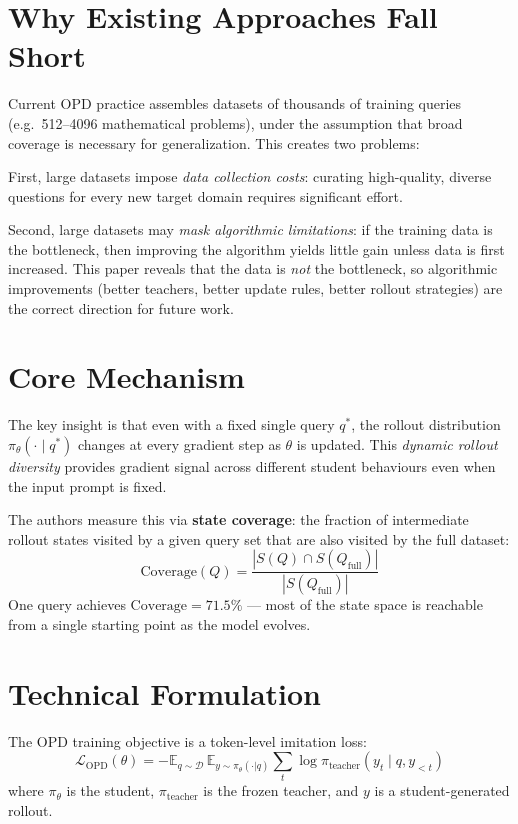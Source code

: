 \documentclass[10pt,twocolumn]{article}
\begin{document}
\section{Why Existing Approaches Fall Short}

Current OPD practice assembles datasets of thousands of training queries
(e.g.\ 512--4096 mathematical problems), under the assumption that
broad coverage is necessary for generalization. This creates two problems:

First, large datasets impose \emph{data collection costs}: curating
high-quality, diverse questions for every new target domain requires
significant effort.

Second, large datasets may \emph{mask algorithmic limitations}: if the
training data is the bottleneck, then improving the algorithm yields
little gain unless data is first increased. This paper reveals that
the data is \emph{not} the bottleneck, so algorithmic improvements
(better teachers, better update rules, better rollout strategies) are
the correct direction for future work.

\section{Core Mechanism}

The key insight is that even with a fixed single query $q^*$, the
rollout distribution $\pi_\theta(\cdot\mid q^*)$ changes at every
gradient step as $\theta$ is updated. This \emph{dynamic rollout
diversity} provides gradient signal across different student behaviours
even when the input prompt is fixed.

The authors measure this via \textbf{state coverage}: the fraction of
intermediate rollout states visited by a given query set that are also
visited by the full dataset:
\[
  \mathrm{Coverage}(Q) = \frac{|S(Q) \cap S(Q_\mathrm{full})|}{|S(Q_\mathrm{full})|}
\]
One query achieves $\mathrm{Coverage} = 71.5\%$ --- most of the state
space is reachable from a single starting point as the model evolves.

\section{Technical Formulation}

The OPD training objective is a token-level imitation loss:
\[
  \mathcal{L}_\mathrm{OPD}(\theta) = -\mathbb{E}_{q \sim \mathcal{D}}\,
  \mathbb{E}_{y \sim \pi_\theta(\cdot|q)}
  \sum_t \log \pi_\mathrm{teacher}(y_t \mid q, y_{<t})
\]
where $\pi_\theta$ is the student, $\pi_\mathrm{teacher}$ is the frozen
teacher, and $y$ is a student-generated rollout.
\end{document}
